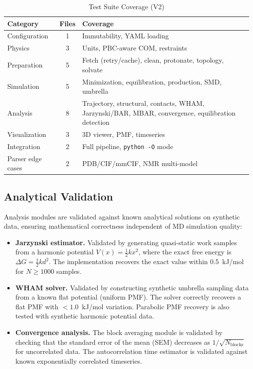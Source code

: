\documentclass[conference]{IEEEtran}
\begin{document}
\begin{table}[H]
  \centering
  \caption{Test Suite Coverage (V2)}
  \label{tab:tests}
  \begin{tabular}{@{}lcp{3.5cm}@{}}
    \toprule
    \textbf{Category} & \textbf{Files} & \textbf{Coverage} \\
    \midrule
    Configuration & 1 & Immutability, YAML loading \\
    Physics & 3 & Units, PBC-aware COM, restraints \\
    Preparation & 5 & Fetch (retry/cache), clean, protonate, topology, solvate \\
    Simulation & 5 & Minimization, equilibration, production, SMD, umbrella \\
    Analysis & 8 & Trajectory, structural, contacts, WHAM, Jarzynski/BAR, MBAR, convergence, equilibration detection \\
    Visualization & 3 & 3D viewer, PMF, timeseries \\
    Integration & 2 & Full pipeline, \texttt{python~-O} mode \\
    Parser edge cases & 2 & PDB/CIF/mmCIF, NMR multi-model \\
    \bottomrule
  \end{tabular}
\end{table}

\subsection{Analytical Validation}

Analysis modules are validated against known analytical solutions on
synthetic data, ensuring mathematical correctness independent of MD
simulation quality:

\begin{itemize}
  \item \textbf{Jarzynski estimator.}  Validated by generating quasi-static
    work samples from a harmonic potential $V(x) = \tfrac{1}{2}kx^2$, where
    the exact free energy is $\Delta G = \tfrac{1}{2}kd^2$.  The
    implementation recovers the exact value within 0.5~kJ/mol for
    $N \geq 1000$ samples.

  \item \textbf{WHAM solver.}  Validated by constructing synthetic umbrella
    sampling data from a known flat potential (uniform PMF).  The solver
    correctly recovers a flat PMF with $< 1.0$~kJ/mol variation.  Parabolic
    PMF recovery is also tested with synthetic harmonic potential data.

  \item \textbf{Convergence analysis.}  The block averaging module is
    validated by checking that the standard error of the mean (SEM)
    decreases as $1/\sqrt{N_{\mathrm{blocks}}}$ for uncorrelated data.
    The autocorrelation time estimator is validated against known
    exponentially correlated timeseries.
\end{itemize}
\end{document}
